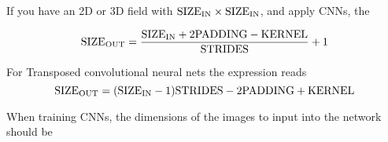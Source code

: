 \documentclass[12pt,a4paper]{paper}
\begin{document}

  




If you have an 2D or 3D field with ${\rm SIZE_{IN}}\times{\rm SIZE_{IN}}$, and apply CNNs, the 

\begin{equation}
{\rm SIZE_{OUT}} = \frac{{\rm SIZE_{IN}} + 2{\rm PADDING} - {\rm KERNEL}}{{\rm STRIDES}} + 1
\end{equation}

\vspace{1cm}

For Transposed convolutional neural nets the expression reads
\begin{equation}
{\rm SIZE_{OUT}} = ({\rm SIZE_{IN}-1}){\rm STRIDES} - 2{\rm PADDING} + {\rm KERNEL}
\end{equation}

When training CNNs, the dimensions of the images to input into the network should be
\begin{equation}
[ {\rm BATCH\,\,SIZE, \,\,CHANNELS, \,\,HEIGHT, \,\,WIDTH} ]
\end{equation}



%

 
\end{document}
